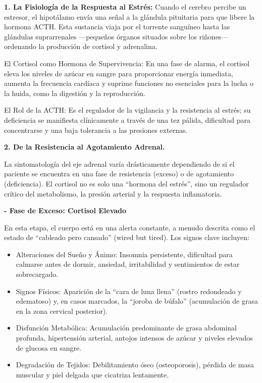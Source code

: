 \documentclass[
  spanish,
]{article}
\begin{document}
\textbf{1. La Fisiología de la Respuesta al Estrés:}
Cuando el cerebro percibe un estresor, el hipotálamo envía una señal a la glándula pituitaria para que libere la hormona ACTH. Esta sustancia viaja por el torrente sanguíneo hasta las glándulas suprarrenales ---pequeños órganos situados sobre los riñones--- ordenando la producción de cortisol y adrenalina.

El Cortisol como Hormona de Supervivencia: En una fase de alarma, el cortisol eleva los niveles de azúcar en sangre para proporcionar energía inmediata, aumenta la frecuencia cardíaca y suprime funciones no esenciales para la lucha o la huida, como la digestión y la reproducción.

El Rol de la ACTH: Es el regulador de la vigilancia y la resistencia al estrés; su deficiencia se manifiesta clínicamente a través de una tez pálida, dificultad para concentrarse y una baja tolerancia a las presiones externas.

\textbf{2. De la Resistencia al Agotamiento Adrenal.}

La sintomatología del eje adrenal varía drásticamente dependiendo de si el paciente se encuentra en una fase de resistencia (exceso) o de agotamiento (deficiencia). El cortisol no es solo una ``hormona del estrés'', sino un regulador crítico del metabolismo, la presión arterial y la respuesta inflamatoria.

\textbf{- Fase de Exceso: Cortisol Elevado}

En esta etapa, el cuerpo está en una alerta constante, a menudo descrita como el estado de ``cableado pero cansado'' (wired but tired). Los signos clave incluyen:

\begin{itemize}
\item
  Alteraciones del Sueño y Ánimo: Insomnia persistente, dificultad para calmarse antes de dormir, ansiedad, irritabilidad y sentimientos de estar sobrecargado.
\item
  Signos Físicos: Aparición de la ``cara de luna llena'' (rostro redondeado y edematoso) y, en casos marcados, la ``joroba de búfalo'' (acumulación de grasa en la zona cervical posterior).
\item
  Disfunción Metabólica: Acumulación predominante de grasa abdominal profunda, hipertensión arterial, antojos intensos de azúcar y niveles elevados de glucosa en sangre.
\item
  Degradación de Tejidos: Debilitamiento óseo (osteoporosis), pérdida de masa muscular y piel delgada que cicatriza lentamente.
\end{itemize}
\end{document}

